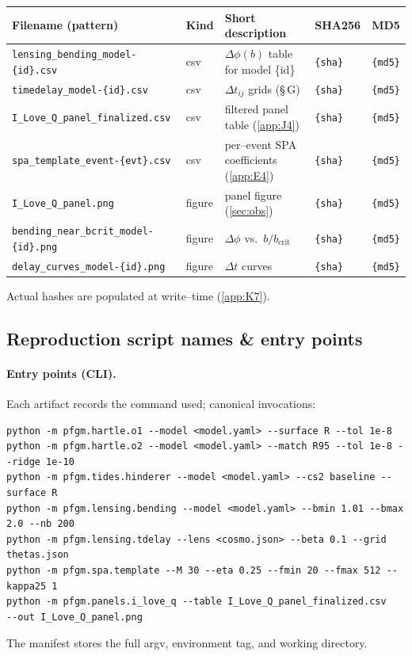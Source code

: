 \documentclass{iopjournal}
\begin{document}
\begin{table}[H]
\centering
{%
  \setlength{\tabcolsep}{3.75pt}%
  \renewcommand{\arraystretch}{1.05}%
  \begin{tabularx}{\linewidth}{@{} l l Y l l @{}}
  \toprule
  Filename (pattern) & Kind & Short description & SHA256 & MD5 \\
  \midrule
  \texttt{lensing\_bending\_model-\{id\}.csv}      & csv    & $\Delta\phi(b)$ table for model \{id\}                & \texttt{\{sha\}} & \texttt{\{md5\}} \\
  \texttt{timedelay\_model-\{id\}.csv}             & csv    & $\Delta t_{ij}$ grids (\S\,G)                          & \texttt{\{sha\}} & \texttt{\{md5\}} \\
  \texttt{I\_Love\_Q\_panel\_finalized.csv}        & csv    & filtered panel table (\cref{app:J4})                   & \texttt{\{sha\}} & \texttt{\{md5\}} \\
  \texttt{spa\_template\_event-\{evt\}.csv}        & csv    & per--event SPA coefficients (\cref{app:E4})            & \texttt{\{sha\}} & \texttt{\{md5\}} \\
  \texttt{I\_Love\_Q\_panel.png}                   & figure & panel figure (\cref{sec:obs})                          & \texttt{\{sha\}} & \texttt{\{md5\}} \\
  \texttt{bending\_near\_bcrit\_model-\{id\}.png}  & figure & $\Delta\phi$ vs.\ $b/b_{\mathrm{crit}}$                & \texttt{\{sha\}} & \texttt{\{md5\}} \\
  \texttt{delay\_curves\_model-\{id\}.png}         & figure & $\Delta t$ curves                                       & \texttt{\{sha\}} & \texttt{\{md5\}} \\
  \bottomrule
  \end{tabularx}%
}
\end{table}


Actual hashes are populated at write--time (\cref{app:K7}).


\subsection{Reproduction script names \& entry points}
\paragraph{Entry points (CLI).}
Each artifact records the command used; canonical invocations:
\begin{verbatim}
python -m pfgm.hartle.o1 --model <model.yaml> --surface R --tol 1e-8
python -m pfgm.hartle.o2 --model <model.yaml> --match R95 --tol 1e-8 --ridge 1e-10
python -m pfgm.tides.hinderer --model <model.yaml> --cs2 baseline --surface R
python -m pfgm.lensing.bending --model <model.yaml> --bmin 1.01 --bmax 2.0 --nb 200
python -m pfgm.lensing.tdelay --lens <cosmo.json> --beta 0.1 --grid thetas.json
python -m pfgm.spa.template --M 30 --eta 0.25 --fmin 20 --fmax 512 --kappa25 1
python -m pfgm.panels.i_love_q --table I_Love_Q_panel_finalized.csv
--out I_Love_Q_panel.png
\end{verbatim}
The manifest stores the full argv, environment tag, and working directory.
\end{document}
